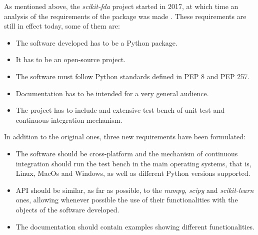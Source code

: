 
As mentioned above, the \textit{scikit-fda} project started in 2017, at which time an
analysis of the requirements of the package was made \cite{FDA2018}. These
requirements are still in effect today, some of them are:

\begin{itemize}
\item The software developed has to be a Python package.
\item It has to be an open-source project.
\item The software must follow Python standards defined in PEP 8 and PEP 257.
\item Documentation has to be intended for a very general audience.
\item The project has to include and extensive test bench of unit test and continuous integration mechanism.
\end{itemize}
In addition to the original ones, three new requirements have been formulated:

\begin{itemize}
\item The software should be cross-platform and the mechanism of
 continuous integration should run the test bench in the main operating systems, that is, 
 Linux, MacOs and Windows, as well as different Python versions supported.
 
\item  API should be similar, as far as possible, to the \textit{numpy}\cite{numpy}, \textit{scipy}\cite{scipy} and
 \textit{scikit-learn}\cite{sklearn} ones, allowing whenever possible the use of their functionalities with the
  objects of the software developed.
\item The documentation should contain examples showing different functionalities.
\end{itemize}

